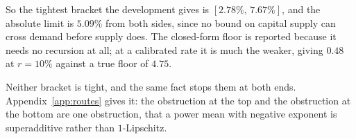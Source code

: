 So the tightest bracket the development gives is $[2.78\%,\,7.67\%]$, and the absolute limit is
$5.09\%$ from both sides, since no bound on capital supply can cross demand before supply does.
The closed-form floor is reported because it needs no recursion at all; at a calibrated rate it is
much the weaker, giving $0.48$ at $r=10\%$ against a true floor of $4.75$.

Neither bracket is tight, and the same fact stops them at both ends. Appendix~\ref{app:routes} gives
it: the obstruction at the top and the obstruction at the bottom are one obstruction, that a power
mean with negative exponent is superadditive rather than $1$-Lipschitz.

